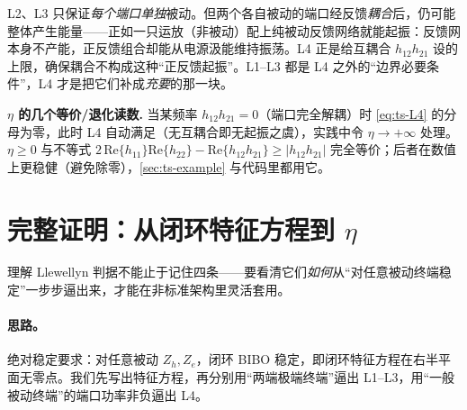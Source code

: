 \begin{insight}
L2、L3 只保证\emph{每个端口单独}被动。但两个各自被动的端口经反馈\emph{耦合}后，仍可能整体产生能量——正如一只运放（非被动）配上纯被动反馈网络就能起振：反馈网本身不产能，正反馈组合却能从电源汲能维持振荡。L4 正是给互耦合 $h_{12}h_{21}$ 设的上限，确保耦合不构成这种“正反馈起振”。L1--L3 都是 L4 之外的“边界必要条件”，L4 才是把它们补成\emph{充要}的那一块。
\end{insight}

\begin{note}
\textbf{$\eta$ 的几个等价/退化读数.}\;
当某频率 $h_{12}h_{21}=0$（端口完全解耦）时 \cref{eq:ts-L4} 的分母为零，此时 L4 自动满足（无互耦合即无起振之虞），实践中令 $\eta\to+\infty$ 处理。
$\eta\ge0$ 与不等式 $2\,\mathrm{Re}\{h_{11}\}\mathrm{Re}\{h_{22}\}-\mathrm{Re}\{h_{12}h_{21}\}\ge|h_{12}h_{21}|$ 完全等价；后者在数值上更稳健（避免除零），\cref{sec:ts-example} 与代码里都用它。
\end{note}

\section{完整证明：从闭环特征方程到 \texorpdfstring{$\eta$}{eta}}
\label{sec:ts-proof}

理解 Llewellyn 判据不能止于记住四条——要看清它们\emph{如何}从“对任意被动终端稳定”一步步逼出来，才能在非标准架构里灵活套用。

\paragraph{思路。}
绝对稳定要求：对任意被动 $Z_h,Z_e$，闭环 BIBO 稳定，即闭环特征方程在右半平面无零点。我们先写出特征方程，再分别用“两端极端终端”逼出 L1--L3，用“一般被动终端”的端口功率非负逼出 L4。

